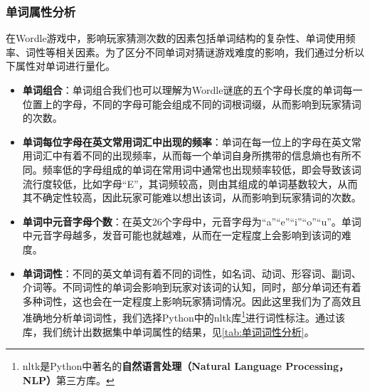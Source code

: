 \documentclass{MathModeling}
\begin{document}
	\subsubsection{单词属性分析}
	在Wordle游戏中，影响玩家猜测次数的因素包括单词结构的复杂性、单词使用频率、词性等相关因素。为了区分不同单词对猜谜游戏难度的影响，我们通过分析以下属性对单词进行量化。
\begin{itemize}
	\item \textbf{单词组合}：单词组合我们也可以理解为Wordle谜底的五个字母长度的单词每一位置上的字母，不同的字母可能会组成不同的词根词缀，从而影响到玩家猜词的次数。
	\item \textbf{单词每位字母在英文常用词汇中出现的频率}：单词在每一位上的字母在英文常用词汇中有着不同的出现频率，从而每一个单词自身所携带的信息熵也有所不同。频率低的字母组成的单词在常用词中通常也出现频率较低，即会导致该词流行度较低，比如字母“E”，其词频较高，则由其组成的单词基数较大，从而其不确定性较高，因此玩家可能难以想出该词，从而影响到玩家猜词的次数。
	\item \textbf{单词中元音字母个数}：在英文26个字母中，元音字母为“a”“e”“i”“o”“u”。单词中元音字母越多，发音可能也就越难，从而在一定程度上会影响到该词的难度。
	\item \textbf{单词词性}：不同的英文单词有着不同的词性，如名词、动词、形容词、副词、介词等。不同词性的单词会影响到玩家对该词的认知，同时，部分单词还有着多种词性，这也会在一定程度上影响玩家猜词情况。因此这里我们为了高效且准确地分析单词词性，我们选择Python中的nltk库\textcolor{blue}{\footnote{nltk是Python中著名的\textbf{自然语言处理（Natural Language Processing，NLP）}第三方库。}}进行词性标注。通过该库，我们统计出数据集中单词属性的结果，见\textcolor{blue}{\cref{tab:单词词性分析}}。
\begin{table}[H]
	\centering
	\caption{单词词性分析}
\end{table}
\end{itemize}
\end{document}
